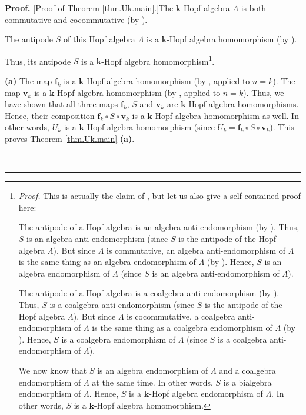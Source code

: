 \documentclass[numbers=enddot,12pt,final,onecolumn,notitlepage]{scrartcl}%
\theoremstyle{definition}
\newenvironment{proof}[1][Proof]{\noindent\textbf{#1.} }{\ \rule{0.5em}{0.5em}}
\newenvironment{verlong}{}{}
\newenvironment{vershort}{}{}
\begin{document}
\begin{proof}
[Proof of Theorem \ref{thm.Uk.main}.]The $\mathbf{k}$-Hopf algebra $\Lambda$
is both commutative and cocommutative (by \cite[Exercise 2.3.7(a)]{GriRei}).

\begin{vershort}
The antipode $S$ of this Hopf algebra $\Lambda$ is a $\mathbf{k}$-Hopf algebra
homomorphism (by \cite[Proposition 2.4.3(g)]{GriRei}).
\end{vershort}

\begin{verlong}
Thus, its antipode $S$ is a $\mathbf{k}$-Hopf algebra
homomorphism\footnote{\textit{Proof.} This is actually the claim of
\cite[Proposition 2.4.3(g)]{GriRei}, but let us also give a self-contained
proof here:
\par
The antipode of a Hopf algebra is an algebra anti-endomorphism (by
\cite[Proposition 1.4.10]{GriRei}). Thus, $S$ is an algebra anti-endomorphism
(since $S$ is the antipode of the Hopf algebra $\Lambda$). But since $\Lambda$
is commutative, an algebra anti-endomorphism of $\Lambda$ is the same thing as
an algebra endomorphism of $\Lambda$ (by \cite[Exercise 1.5.8(a)]{GriRei}).
Hence, $S$ is an algebra endomorphism of $\Lambda$ (since $S$ is an algebra
anti-endomorphism of $\Lambda$).
\par
The antipode of a Hopf algebra is a coalgebra anti-endomorphism (by
\cite[Exercise 1.4.28]{GriRei}). Thus, $S$ is a coalgebra anti-endomorphism
(since $S$ is the antipode of the Hopf algebra $\Lambda$). But since $\Lambda$
is cocommutative, a coalgebra anti-endomorphism of $\Lambda$ is the same thing
as a coalgebra endomorphism of $\Lambda$ (by \cite[Exercise 1.5.8(b)]%
{GriRei}). Hence, $S$ is a coalgebra endomorphism of $\Lambda$ (since $S$ is a
coalgebra anti-endomorphism of $\Lambda$).
\par
We now know that $S$ is an algebra endomorphism of $\Lambda$ and a coalgebra
endomorphism of $\Lambda$ at the same time. In other words, $S$ is a bialgebra
endomorphism of $\Lambda$. Hence, $S$ is a $\mathbf{k}$-Hopf algebra
endomorphism of $\Lambda$. In other words, $S$ is a $\mathbf{k}$-Hopf algebra
homomorphism.}.
\end{verlong}

\textbf{(a)} The map $\mathbf{f}_{k}$ is a $\mathbf{k}$-Hopf algebra
homomorphism (by \cite[Exercise 2.9.9(d)]{GriRei}, applied to $n=k$). The map
$\mathbf{v}_{k}$ is a $\mathbf{k}$-Hopf algebra homomorphism (by
\cite[Exercise 2.9.10(e)]{GriRei}, applied to $n=k$). Thus, we have shown that
all three maps $\mathbf{f}_{k}$, $S$ and $\mathbf{v}_{k}$ are $\mathbf{k}%
$-Hopf algebra homomorphisms. Hence, their composition $\mathbf{f}_{k}\circ
S\circ\mathbf{v}_{k}$ is a $\mathbf{k}$-Hopf algebra homomorphism as well. In
other words, $U_{k}$ is a $\mathbf{k}$-Hopf algebra homomorphism (since
$U_{k}=\mathbf{f}_{k}\circ S\circ\mathbf{v}_{k}$). This proves Theorem
\ref{thm.Uk.main} \textbf{(a)}.


\end{proof}
\end{document}
